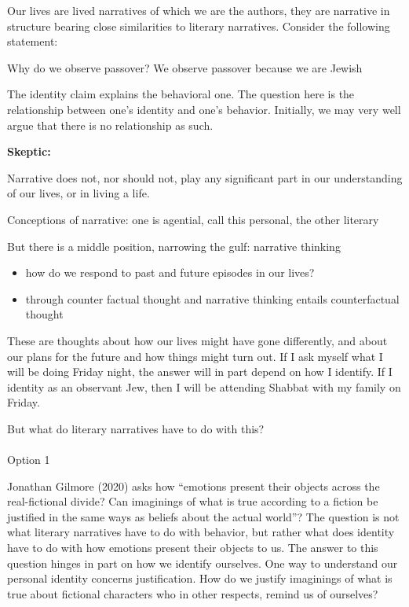 \documentclass[
  letterpaper,
  DIV=11,
  numbers=noendperiod]{scrartcl}
\makeatletter
\let\oldparagraph\paragraph
\renewcommand{\paragraph}{
    \@ifstar
      \xxxParagraphStar
      \xxxParagraphNoStar
  }
\newcommand{\xxxParagraphStar}[1]{\oldparagraph*{#1}\mbox{}}
\newcommand{\xxxParagraphNoStar}[1]{\oldparagraph{#1}\mbox{}}
\theoremstyle{remark}
\makeatother
\begin{document}
Our lives are lived narratives of which we are the authors, they are
narrative in structure bearing close similarities to literary
narratives. Consider the following statement:

Why do we observe passover? We observe passover because we are Jewish

The identity claim explains the behavioral one. The question here is the
relationship between one's identity and one's behavior. Initially, we
may very well argue that there is no relationship as such.

\textbf{Skeptic:}

Narrative does not, nor should not, play any significant part in our
understanding of our lives, or in living a life.

Conceptions of narrative: one is agential, call this personal, the other
literary

But there is a middle position, narrowing the gulf: narrative thinking

\begin{itemize}
\item
  how do we respond to past and future episodes in our lives?
\item
  through counter factual thought and narrative thinking entails
  counterfactual thought
\end{itemize}

These are thoughts about how our lives might have gone differently, and
about our plans for the future and how things might turn out. If I ask
myself what I will be doing Friday night, the answer will in part depend
on how I identify. If I identity as an observant Jew, then I will be
attending Shabbat with my family on Friday.

But what do literary narratives have to do with this?

\paragraph{Option 1}\label{option-1}

Jonathan Gilmore (2020) asks how ``emotions present their objects across
the real-fictional divide? Can imaginings of what is true according to a
fiction be justified in the same ways as beliefs about the actual
world''? The question is not what literary narratives have to do with
behavior, but rather what does identity have to do with how emotions
present their objects to us. The answer to this question hinges in part
on how we identify ourselves. One way to understand our personal
identity concerns justification. How do we justify imaginings of what is
true about fictional characters who in other respects, remind us of
ourselves?
\end{document}
